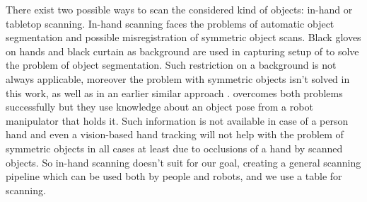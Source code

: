 \documentclass[letterpaper, 10 pt, conference]{ieeeconf}  %
\begin{document}
There exist two possible ways to scan the considered kind of objects: 
in-hand or tabletop scanning. In-hand scanning faces the problems
of automatic object segmentation and possible misregistration of symmetric object scans. 
Black gloves on hands and black curtain as background are used in capturing setup of \cite{weise2011online}
to solve the problem of object segmentation. Such restriction on a background is not always applicable,
moreover the problem with symmetric objects isn't solved in this work, 
as well as in an earlier similar approach \cite{rusinkiewicz2002real}.
\cite{krainin2011manipulator} overcomes both problems successfully but
they use knowledge about an object pose from a robot manipulator
that holds it. Such information is not available in case of a person hand
and even a vision-based hand tracking will not help with the problem of symmetric
objects in all cases at least due to occlusions of a hand by scanned objects. 
So in-hand scanning doesn't suit for our goal,
creating a general scanning pipeline which can be used both by people and robots,
and we use a table for scanning.
\end{document}
